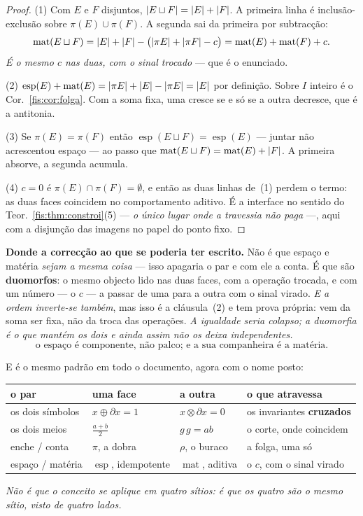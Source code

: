 \documentclass[livro.tex]{subfiles}
\begin{document}
\begin{proof}
(1) Com $E$ e $F$ disjuntos, $\lvert E\sqcup F\rvert=\lvert E\rvert+\lvert F\rvert$. A primeira linha é
inclusão-exclusão sobre $\pi(E)\cup\pi(F)$. A segunda sai da primeira por
subtracção:
\[
\operatorname{mat}(E\sqcup F)=\lvert E\rvert+\lvert F\rvert-\bigl(\lvert \pi E\rvert+\lvert \pi F\rvert-c\bigr)
=\operatorname{mat}(E)+\operatorname{mat}(F)+c .
\]
\emph{É o mesmo $c$ nas duas, com o sinal trocado} --- que é o enunciado.

(2) $\operatorname{esp}(E)+\operatorname{mat}(E)=\lvert \pi E\rvert+\lvert E\rvert-\lvert \pi E\rvert=\lvert E\rvert$
por definição. Sobre $I$ inteiro é o Cor.~\ref{fis:cor:folga}. Com a soma fixa,
uma cresce se e só se a outra decresce, que é a antitonia.

(3) Se $\pi(E)=\pi(F)$ então $\operatorname{esp}(E\sqcup F)=\operatorname{esp}(E)$
--- juntar não acrescentou espaço --- ao passo que
$\operatorname{mat}(E\sqcup F)=\operatorname{mat}(E)+\lvert F\rvert$. A primeira absorve,
a segunda acumula.

(4) $c=0$ é $\pi(E)\cap\pi(F)=\emptyset$, e então as duas linhas de~(1) perdem o
termo: as duas faces coincidem no comportamento aditivo. É a interface no sentido
do Teor.~\ref{fis:thm:constroi}(5) --- \emph{o único lugar onde a travessia não
paga} ---, aqui com a disjunção das imagens no papel do ponto fixo.
\end{proof}

\medskip\noindent\textbf{Donde a correcção ao que se poderia ter escrito.} Não é
que espaço e matéria \emph{sejam a mesma coisa} --- isso apagaria o par e com ele
a conta. É que são \textbf{duomorfos}: o mesmo objecto lido nas duas faces, com a
operação trocada, e com um número --- o $c$ --- a passar de uma para a outra com
o sinal virado. \emph{E a ordem inverte-se também}, mas isso é a cláusula~(2) e
tem prova própria: vem da soma ser fixa, não da troca das operações. \emph{A igualdade seria colapso; a duomorfia
é o que mantém os dois e ainda assim não os deixa independentes.}
\[
\boxed{\;\text{o espaço é componente, não palco; e a sua companheira é a matéria.}\;}
\]

\medskip\noindent E é o mesmo padrão em todo o documento, agora com o nome posto:
\begin{center}\small
\begin{tabular}{@{}llll@{}}
\toprule
o par & uma face & a outra & o que atravessa \\
\midrule
os dois símbolos & $x\oplus\partial x=1$ & $x\otimes\partial x=0$ & os invariantes \textbf{cruzados} \\
os dois meios & $\tfrac{a+b}{2}$ & $g\,g=ab$ & o corte, onde coincidem \\
enche / conta & $\pi$, a dobra & $\rho$, o buraco & a folga, uma só \\
espaço / matéria & $\operatorname{esp}$, idempotente & $\operatorname{mat}$, aditiva & o $c$, com o sinal virado \\
\bottomrule
\end{tabular}
\end{center}
\emph{Não é que o conceito se aplique em quatro sítios: é que os quatro são o
mesmo sítio, visto de quatro lados.}
\end{document}
